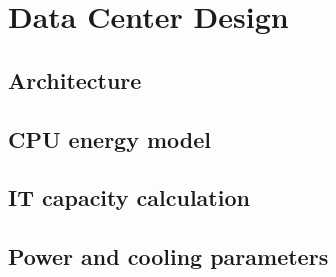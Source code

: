 \chapter{Data Center Design}

\begin{citazione}

\end{citazione}
\newpage

\section{Architecture}

\section{CPU energy model}

\section{IT capacity calculation}

\section{Power and cooling parameters}

